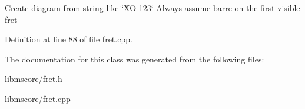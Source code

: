 Create diagram from string like \char`\"{}\+X\+O-\/123\char`\"{} Always assume barre on the first visible fret 

Definition at line 88 of file fret.\+cpp.



The documentation for this class was generated from the following files\+:\begin{DoxyCompactItemize}
\item 
libmscore/fret.\+h\item 
libmscore/fret.\+cpp\end{DoxyCompactItemize}
